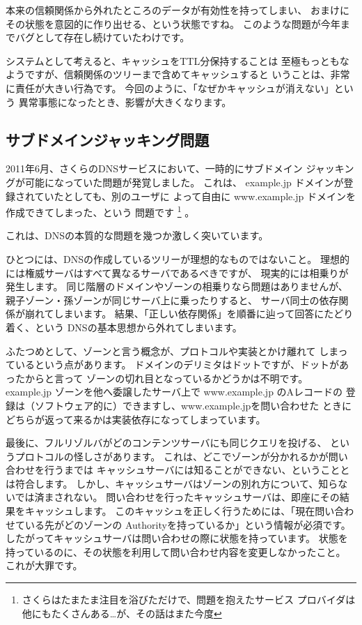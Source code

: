 本来の信頼関係から外れたところのデータが有効性を持ってしまい、
おまけにその状態を意図的に作り出せる、という状態ですね。
このような問題が今年までバグとして存在し続けていたわけです。

システムとして考えると、キャッシュをTTL分保持することは
至極もっともなようですが、信頼関係のツリーまで含めてキャッシュすると
いうことは、非常に責任が大きい行為です。
今回のように、「なぜかキャッシュが消えない」という
異常事態になったとき、影響が大きくなります。


\subsection{ サブドメインジャッキング問題 }
2011年6月、さくらのDNSサービスにおいて、一時的にサブドメイン
ジャッキングが可能になっていた問題が発覚しました。
これは、 example.jp ドメインが登録されていたとしても、別のユーザに
よって自由に www.example.jp ドメインを作成できてしまった、という
問題です
\footnote{さくらはたまたま注目を浴びただけで、問題を抱えたサービス
プロバイダは他にもたくさんある…が、その話はまた今度}
。

これは、DNSの本質的な問題を幾つか激しく突いています。

ひとつには、DNSの作成しているツリーが理想的なものではないこと。
理想的には権威サーバはすべて異なるサーバであるべきですが、
現実的には相乗りが発生します。
同じ階層のドメインやゾーンの相乗りなら問題はありませんが、
親子ゾーン・孫ゾーンが同じサーバ上に乗ったりすると、
サーバ同士の依存関係が崩れてしまいます。
結果、「正しい依存関係」を順番に辿って回答にたどり着く、という
DNSの基本思想から外れてしまいます。

ふたつめとして、ゾーンと言う概念が、プロトコルや実装とかけ離れて
しまっているという点があります。
ドメインのデリミタはドットですが、ドットがあったからと言って
ゾーンの切れ目となっているかどうかは不明です。
example.jp ゾーンを他へ委譲したサーバ上で www.example.jp のAレコードの
登録は（ソフトウェア的に）できますし、www.example.jpを問い合わせた
ときにどちらが返って来るかは実装依存になってしまっています。


最後に、フルリゾルバがどのコンテンツサーバにも同じクエリを投げる、
というプロトコルの怪しさがあります。
これは、どこでゾーンが分かれるかが問い合わせを行うまでは
キャッシュサーバには知ることができない、ということとは符合します。
しかし、キャッシュサーバはゾーンの別れ方について、知らないでは済まされない。
問い合わせを行ったキャッシュサーバは、即座にその結果をキャッシュします。
このキャッシュを正しく行うためには、「現在問い合わせている先がどのゾーンの
Authorityを持っているか」という情報が必須です。
したがってキャッシュサーバは問い合わせの際に状態を持っています。
状態を持っているのに、その状態を利用して問い合わせ内容を変更しなかったこと。
これが大罪です。

